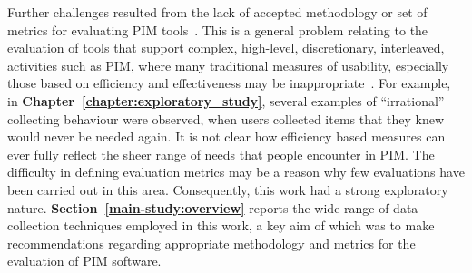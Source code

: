 Further challenges resulted from the lack of accepted methodology or set of metrics for evaluating PIM tools~\citep{Whittaker-rta:00}.  This is a general problem relating to the evaluation of tools that support complex, high-level, discretionary, interleaved, activities such as PIM, where many traditional measures of usability, especially those based on efficiency and effectiveness may be inappropriate~\citep{ad:01}.  For example, in \textbf{Chapter~\ref{chapter:exploratory_study}}, several examples of ``irrational'' collecting behaviour were observed, when users collected items that they knew would never be needed again.  It is not clear how efficiency based measures can ever fully reflect the sheer range of needs that people encounter in PIM.   The difficulty in defining evaluation metrics may be a reason why few evaluations have been carried out in this area.
Consequently, this work had a strong exploratory nature.  \textbf{Section~\ref{main-study:overview}} reports the wide range of data collection techniques employed in this work, a key aim of which was to make recommendations regarding appropriate methodology and metrics for the evaluation of PIM software. 


